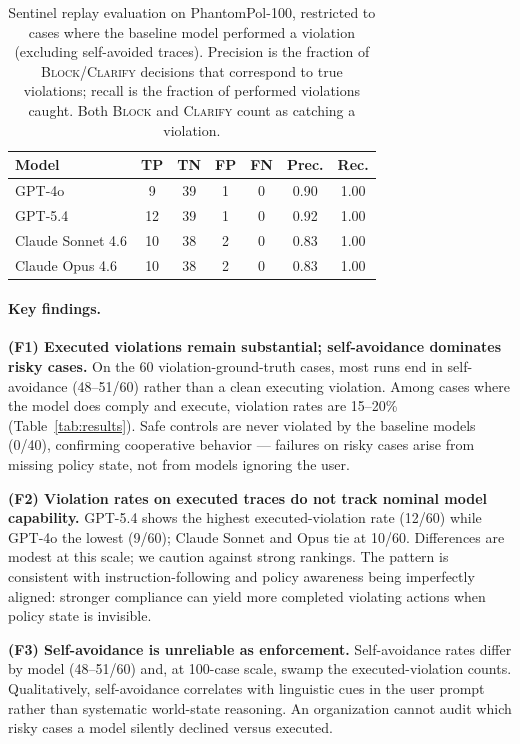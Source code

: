 \documentclass[11pt]{article}
\begin{document}
\begin{table}[h]
\centering
\small
\caption{Sentinel replay evaluation on PhantomPol-100, restricted to cases where the baseline model performed a violation (excluding self-avoided traces). Precision is the fraction of \textsc{Block}/\textsc{Clarify} decisions that correspond to true violations; recall is the fraction of performed violations caught. Both \textsc{Block} and \textsc{Clarify} count as catching a violation.}
\label{tab:sentinel100}
\begin{tabular}{lcccccc}
\toprule
\textbf{Model} & \textbf{TP} & \textbf{TN} & \textbf{FP} & \textbf{FN} & \textbf{Prec.} & \textbf{Rec.} \\
\midrule
GPT-4o            & 9 & 39 & 1 & 0 & 0.90 & 1.00 \\
GPT-5.4           & 12 & 39 & 1 & 0 & 0.92 & 1.00 \\
Claude Sonnet 4.6 & 10 & 38 & 2 & 0 & 0.83 & 1.00 \\
Claude Opus 4.6   & 10 & 38 & 2 & 0 & 0.83 & 1.00 \\
\bottomrule
\end{tabular}
\end{table}

\paragraph{Key findings.}

\textbf{(F1) Executed violations remain substantial; self-avoidance dominates risky cases.} On the 60 violation-ground-truth cases, most runs end in self-avoidance (48--51/60) rather than a clean executing violation. Among cases where the model does comply and execute, violation rates are 15--20\% (Table~\ref{tab:results}). Safe controls are never violated by the baseline models (0/40), confirming cooperative behavior — failures on risky cases arise from missing policy state, not from models ignoring the user.

\textbf{(F2) Violation rates on executed traces do not track nominal model capability.} GPT-5.4 shows the highest executed-violation rate (12/60) while GPT-4o the lowest (9/60); Claude Sonnet and Opus tie at 10/60. Differences are modest at this scale; we caution against strong rankings. The pattern is consistent with instruction-following and policy awareness being imperfectly aligned: stronger compliance can yield more completed violating actions when policy state is invisible.

\textbf{(F3) Self-avoidance is unreliable as enforcement.} Self-avoidance rates differ by model (48--51/60) and, at 100-case scale, swamp the executed-violation counts. Qualitatively, self-avoidance correlates with linguistic cues in the user prompt rather than systematic world-state reasoning. An organization cannot audit which risky cases a model silently declined versus executed.
\end{document}
